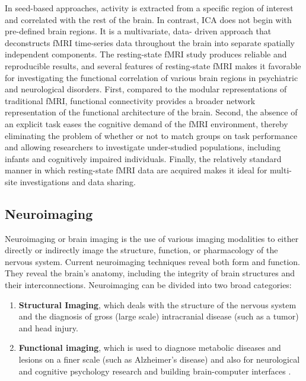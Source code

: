 \documentclass{article}
\begin{document}
In seed-based approaches, activity is extracted from a specific region
of interest and correlated with the rest of the brain. In contrast,
ICA does not begin with pre-defined brain regions. It is a
multivariate, data- driven approach that deconstructs fMRI time-series
data throughout the brain into separate spatially independent
components. The resting-state fMRI study produces reliable and
reproducible results, and several features of resting-state fMRI makes
it favorable for investigating the functional correlation of various
brain regions in psychiatric and neurological disorders. First,
compared to the modular representations of traditional fMRI,
functional connectivity provides a broader network representation of
the functional architecture of the brain. Second, the absence of an
explicit task eases the cognitive demand of the fMRI environment,
thereby eliminating the problem of whether or not to match groups on
task performance and allowing researchers to investigate under-studied
populations, including infants and cognitively impaired individuals.
Finally, the relatively standard manner in which resting-state fMRI
data are acquired makes it ideal for multi-site investigations and
data sharing.\cite{resting}

\subsection{Neuroimaging}

Neuroimaging or brain imaging is the use of various imaging modalities
to either directly or indirectly image the structure, function, or
pharmacology of the nervous system. Current neuroimaging techniques
reveal both form and function. They reveal the brain's anatomy,
including the integrity of brain structures and their
interconnections. Neuroimaging can be divided into two broad
categories:
\vspace{-10pt}
\begin{enumerate}

  \item \textbf{Structural Imaging}, which deals with the structure of
    the nervous system and the diagnosis of gross (large scale)
    intracranial disease (such as a tumor) and head injury.

  \item \textbf{Functional imaging}, which is used to diagnose
        metabolic diseases and lesions on a finer scale (such as
        Alzheimer's disease) and also for neurological and cognitive
        psychology research and building brain-computer interfaces
        \cite{neuroimaging}.

\end{enumerate}
\end{document}

